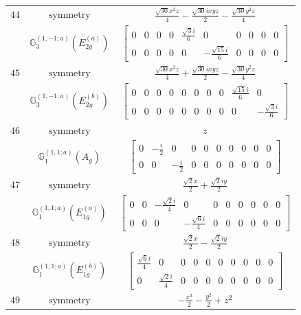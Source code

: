 \documentclass[fleqn,8pt,landscape]{jsarticle}
\begin{document}
\begin{longtable}{ccc}
$ 44 $ & $ \text{symmetry} $ & $ \frac{\sqrt{30} x^{2} z}{4} - \frac{\sqrt{30} i x y z}{2} - \frac{\sqrt{30} y^{2} z}{4} $ \\
$  $ & $ \mathbb{G}_{3}^{(1,-1;a)}(E_{2g}^{(a)}) $ & $ \begin{bmatrix} 0 & 0 & 0 & 0 & \frac{\sqrt{3} i}{6} & 0 & 0 & 0 & 0 & 0 \\ 0 & 0 & 0 & 0 & 0 & - \frac{\sqrt{15} i}{6} & 0 & 0 & 0 & 0 \end{bmatrix} $ \\ \hline
$ 45 $ & $ \text{symmetry} $ & $ \frac{\sqrt{30} x^{2} z}{4} + \frac{\sqrt{30} i x y z}{2} - \frac{\sqrt{30} y^{2} z}{4} $ \\
$  $ & $ \mathbb{G}_{3}^{(1,-1;a)}(E_{2g}^{(b)}) $ & $ \begin{bmatrix} 0 & 0 & 0 & 0 & 0 & 0 & 0 & 0 & \frac{\sqrt{15} i}{6} & 0 \\ 0 & 0 & 0 & 0 & 0 & 0 & 0 & 0 & 0 & - \frac{\sqrt{3} i}{6} \end{bmatrix} $ \\ \hline
$ 46 $ & $ \text{symmetry} $ & $ z $ \\
$  $ & $ \mathbb{G}_{1}^{(1,1;a)}(A_{g}) $ & $ \begin{bmatrix} 0 & - \frac{i}{2} & 0 & 0 & 0 & 0 & 0 & 0 & 0 & 0 \\ 0 & 0 & - \frac{i}{2} & 0 & 0 & 0 & 0 & 0 & 0 & 0 \end{bmatrix} $ \\ \hline
$ 47 $ & $ \text{symmetry} $ & $ \frac{\sqrt{2} x}{2} + \frac{\sqrt{2} i y}{2} $ \\
$  $ & $ \mathbb{G}_{1}^{(1,1;a)}(E_{1g}^{(a)}) $ & $ \begin{bmatrix} 0 & 0 & - \frac{\sqrt{2} i}{4} & 0 & 0 & 0 & 0 & 0 & 0 & 0 \\ 0 & 0 & 0 & - \frac{\sqrt{6} i}{4} & 0 & 0 & 0 & 0 & 0 & 0 \end{bmatrix} $ \\ \hline
$ 48 $ & $ \text{symmetry} $ & $ \frac{\sqrt{2} x}{2} - \frac{\sqrt{2} i y}{2} $ \\
$  $ & $ \mathbb{G}_{1}^{(1,1;a)}(E_{1g}^{(b)}) $ & $ \begin{bmatrix} \frac{\sqrt{6} i}{4} & 0 & 0 & 0 & 0 & 0 & 0 & 0 & 0 & 0 \\ 0 & \frac{\sqrt{2} i}{4} & 0 & 0 & 0 & 0 & 0 & 0 & 0 & 0 \end{bmatrix} $ \\ \hline
$ 49 $ & $ \text{symmetry} $ & $ - \frac{x^{2}}{2} - \frac{y^{2}}{2} + z^{2} $ \\

\end{longtable}
\end{document}
